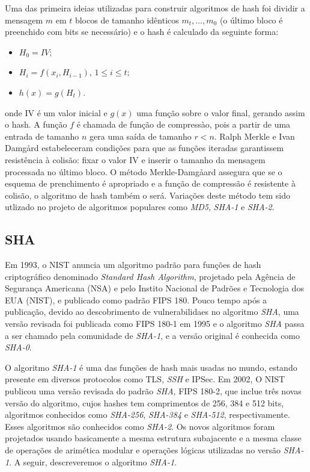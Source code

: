 \documentclass{SBCbookchapter}
\begin{document}
\begin{otherlanguage}{brazilian}
{Uma das primeira ideias utilizadas  para construir algoritmos de hash foi dividir a mensagem $m$ em
$t$ blocos  de tamanho idênticos $m_{t},\ldots, m_0$ (o último bloco é preenchido com bits se necessário)
e o hash é calculado da seguinte forma:
\begin{itemize}
\item $H_0 = IV;$
\item $H_i = f(x_i, H_{i-1})$, \hspace{5mm} $1 \leq i \leq t;$
\item $h(x) = g(H_t).$
\end{itemize}
\noindent onde IV é um valor inicial e $g(x)$ uma função sobre o valor final,
gerando assim o hash. A função $f$ é chamada de função de compressào, pois a partir
de uma entrada de tamanho $n$ gera uma saída de tamanho $r < n$.
Ralph Merkle e Ivan Damg{\aa}rd \cite{merkle:79} estabeleceram condições para que as funções iteradas
garantissem resistência  à colisão: fixar o valor IV e inserir o tamanho da mensagem processada no último bloco.
O método Merkle-Damg{\aa}ard assegura que se o esquema de prenchimento é apropriado e a função de compressão é resistente à colisão, o algoritmo de hash também o  será. Variações deste método tem sido utlizado no projeto
de algoritmos populares como \textit{MD5}, \textit{SHA-1} e \textit{SHA-2}.

\subsection{SHA}

    Em 1993, o NIST anuncia um algoritmo padrão para funções de hash criptográfico denominado \emph{Standard Hash Algorithm}, projetado pela Agência de Segurança Americana (NSA) e pelo Instito Nacional de Padrões e Tecnologia dos EUA (NIST),  e publicado  como padrão FIPS 180.
 Pouco tempo após a publicação, devido ao descobrimento de vulnerabilidaes no algoritmo \textit{SHA}, uma versão revisada foi publicada como FIPS 180-1 em 1995 e o algoritmo \textit{SHA} passa a ser  chamado pela comunidade de \emph{SHA-1},
 e a versão original é conhecida como \textit{SHA-0}.

O algoritmo \textit{SHA-1} é uma das funções de hash mais usadas no mundo, estando presente em diversos protocolos como TLS, \emph{SSH} e IPSec. Em 2002, O NIST publicou uma versão revisada do padrão \textit{SHA}, FIPS 180-2, que inclue três novas versão do algoritmo, cujos hashes tem comprimentos de 256, 384 e 512 bits, algoritmos conhecidos como
\textit{SHA-256}, \textit{SHA-384} e \textit{SHA-512}, respectivamente. Esses algoritmos são conhecidos como \textit{SHA-2}. Os novos algoritmos foram
projetados usando basicamente a mesma estrutura subajacente e a mesma classe de operações  de arimética modular
e operações lógicas utilizadas no versão \textit{SHA-1}.    A seguir, descreveremos o algoritmo \textit{SHA-1}.

}
\end{otherlanguage}
\end{document}
